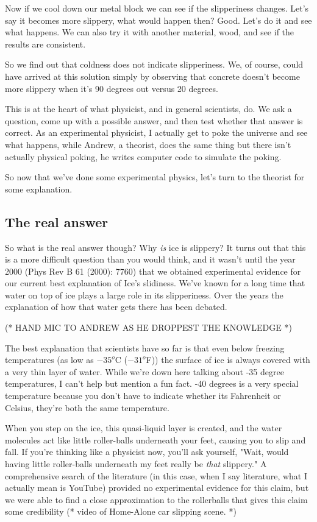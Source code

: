 \documentclass[12pt]{article}
\begin{document}
Now if we cool down our metal block
we can see if the slipperiness changes. Let's say it becomes more slippery, what 
would happen then? Good. Let's do it and see what happens. 
We can also try it with another material, wood, and see if the results are 
consistent.

So we find out that coldness does not indicate slipperiness.
We, of course, could have arrived at this solution simply by observing that
concrete doesn't become more slippery when it's 90 degrees out versus 20 degrees. 

This is at the heart of what physicist, and in general scientists, do. We ask 
a question, come up with a possible answer, and then test whether that answer is
correct. As an experimental physicist, I actually get to poke the universe and
see what happens, while Andrew, a theorist, does the same thing but there isn't actually 
physical poking, he writes computer code to simulate the poking. 

So now that
we've done some experimental physics, let's turn to the theorist for some
explanation.

\subsection{The real answer}
So what is the real answer though? Why \emph{is} ice is slippery? 
It turns out that this is a more difficult question than you would think, and
it wasn't until the year 2000 (Phys Rev B 61 (2000): 7760) 
that we obtained experimental evidence for our 
current best explanation of Ice's slidiness. We've known for a long time
that water on top of ice plays a large role in its slipperiness. Over the years
the explanation of how that water gets there has been debated. 

(* HAND MIC TO ANDREW AS HE DROPPEST THE KNOWLEDGE *)

The best explanation that scientists have so far is that even below freezing 
temperatures (as low as $-35^o$C ($-31^{o}$F)) the surface of ice is always 
covered with a very thin layer of water. While we're down here talking about 
-35 degree temperatures, I can't help but mention a fun fact. -40 degrees is a 
very special temperature because you don't have to indicate whether its 
Fahrenheit or Celsius, they're both the same temperature. 

When you step on the ice,  this quasi-liquid layer is created, and the
water molecules 
act like little roller-balls underneath your feet, causing you to slip and fall. 
If you're thinking like a physicist now, you'll ask yourself, "Wait, would having
little roller-balls underneath my feet really be \emph{that} slippery." A 
comprehensive search of the literature (in this case, when I say literature, 
what I actually mean is YouTube) provided no experimental 
evidence for this claim, but we were able to find a close approximation to 
the rollerballs that gives this claim some credibility (* video of Home-Alone
car slipping scene. *) 
\end{document}
